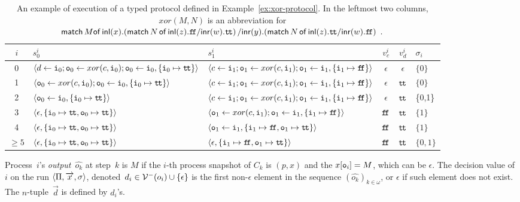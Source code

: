   \begin{sidewaystable}
   \centering
   \caption{An example of execution of a typed protocol defined in
   Example~\ref{ex:xor-protocol}.
   In the leftmost two columns,
   $xor(M,N)$ is an abbreviation for
   $\mathsf{match\,}{M}\mathsf{of}\,\mathsf{inl}({x}).{
  (\mathsf{match}\,{N}\,\mathsf{of}\, \mathsf{inl}({z}). {\texttt{f\kern -1.7pt f}}/ \mathsf{inr}({w}). {\texttt{t\kern -1.2pt t}})
  }\,/ \mathsf{inr}({y}).{
  (\mathsf{match}\,{N}\,\mathsf{of}\, \mathsf{inl}({z}). {\texttt{t\kern -1.2pt t}}/ \mathsf{inr}({w}). {\texttt{f\kern -1.7pt f}})
  }\enspace.$
   }
   \label{table:exec}
   \begin{tabular}{cllcc|l}
    $i$    & $s_0^i$&$s_1^i$ &$v_c^i$ &$v_d^i$ & $\sigma_i$ \\ \hline
    0      & $\langle{d\leftarrow \texttt{i}_0; \texttt{o}_0\leftarrow xor(c, \texttt{i}_0); \texttt{o}_0
   \leftarrow \texttt{i}_0, \{\texttt{i}_0\mapsto \texttt{t\kern -1.2pt t}\}}\rangle$
	& $\langle{c\leftarrow \texttt{i}_1; \texttt{o}_1\leftarrow xor(c, \texttt{i}_1); \texttt{o}_1
   \leftarrow \texttt{i}_1, \{\texttt{i}_1\mapsto \texttt{f\kern -1.7pt f}\}}\rangle$
	    & $\epsilon$
		& $\epsilon$
		    & $\{0\}$ \\ \hline
    1      & $\langle{\texttt{o}_0\leftarrow
  xor(c, \texttt{i}_0); \texttt{o}_0
   \leftarrow \texttt{i}_0, \{\texttt{i}_0\mapsto \texttt{t\kern -1.2pt t}\}}\rangle$
	& $\langle{c\leftarrow \texttt{i}_1; \texttt{o}_1\leftarrow xor(c, \texttt{i}_1); \texttt{o}_1
   \leftarrow \texttt{i}_1, \{\texttt{i}_1\mapsto \texttt{f\kern -1.7pt f}\}}\rangle$
	    & $\epsilon$
		& $\texttt{t\kern -1.2pt t}$
		    & $\{0\}$ \\ \hline
    2      & $\langle{\texttt{o}_0
   \leftarrow \texttt{i}_0, \{\texttt{i}_0\mapsto \texttt{t\kern -1.2pt t}\}}\rangle$
	& $\langle{c\leftarrow \texttt{i}_1; \texttt{o}_1\leftarrow xor(c, \texttt{i}_1); \texttt{o}_1
   \leftarrow \texttt{i}_1, \{\texttt{i}_1\mapsto \texttt{f\kern -1.7pt f}\}}\rangle$
	    & $\epsilon$
		& $\texttt{t\kern -1.2pt t}$
		    & \{0,1\} \\ \hline
    3      & $\langle{\epsilon, \{\texttt{i}_0\mapsto \texttt{t\kern -1.2pt t}, \texttt{o}_0 \mapsto \texttt{t\kern -1.2pt t}\}}\rangle$
	& $\langle{\texttt{o}_1\leftarrow xor(c, \texttt{i}_1); \texttt{o}_1
   \leftarrow \texttt{i}_1, \{\texttt{i}_1\mapsto \texttt{f\kern -1.7pt f}\}}\rangle$
	    & $\texttt{f\kern -1.7pt f}$
		& $\texttt{t\kern -1.2pt t}$
		    & $\{1\}$ \\ \hline
    4      & $\langle{\epsilon, \{\texttt{i}_0\mapsto \texttt{t\kern -1.2pt t}, \texttt{o}_0 \mapsto \texttt{t\kern -1.2pt t}\}}\rangle$
	& $\langle{\texttt{o}_1
   \leftarrow \texttt{i}_1, \{\texttt{i}_1\mapsto \texttt{f\kern -1.7pt f}, \texttt{o}_1\mapsto \texttt{t\kern -1.2pt t}\}}\rangle$
	    & $\texttt{f\kern -1.7pt f}$
		& $\texttt{t\kern -1.2pt t}$
		    & $\{1\}$\\ \hline
    $\ge 5$& $\langle{\epsilon, \{\texttt{i}_0\mapsto \texttt{t\kern -1.2pt t}, \texttt{o}_0 \mapsto \texttt{t\kern -1.2pt t}\}}\rangle$
	& $\langle{\epsilon, \{\texttt{i}_1\mapsto \texttt{f\kern -1.7pt f}, \texttt{o}_1\mapsto \texttt{t\kern -1.2pt t}\}}\rangle$
	    & $\texttt{f\kern -1.7pt f}$
		& $\texttt{t\kern -1.2pt t}$
		    & $\{0,1\}$ \\ \hline
   \end{tabular}
  \end{sidewaystable}

Process~$i$'s \textit{output}~$\hat{o_k}$ at step~$k$ is
$M$ if the $i$-th process snapshot of $C_k$ is
$(p, x)$ and the $x[\texttt{o}_i] = M$, which can be $\epsilon$.
The decision value of $i$ on the run $\langle{\Pi,\overrightarrow x,\sigma}\rangle$,
denoted~$d_i \in \mathcal{V}^-(o_i)\cup\{\epsilon\}$
 is the first non-$\epsilon$ element in the sequence
 $\left(\hat{o_k}\right)_{k\in\omega}$,
 or
$\epsilon$ if such element does not exist.
The $n$-tuple~$\vec d$ is defined by $d_i$'s.

